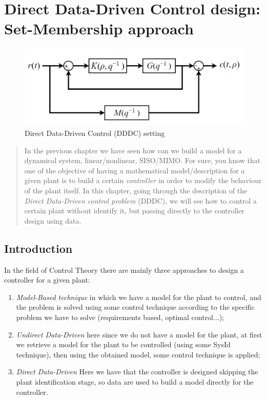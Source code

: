 \chapter[Direct Data-Driven Control (SM approach)]{Direct Data-Driven Control design: Set-Membership approach}\label{chap:DDDC}

\vspace{-1cm}
\begin{figure}[h]
    \centering
    \includegraphics[scale=0.4]{img/DDDC_1.png}
    \caption{Direct Data-Driven Control (DDDC) setting}
    \label{fig:DDDC_setting}
\end{figure}

\begin{quotation}
    \noindent
    \textsf{In the previous chapter we have seen how can we build a model for a dynamical system, linear/nonlinear, SISO/MIMO. For sure, you know that one of the objective of having a mathematical model/description for a given plant is to build a certain \textit{controller} in order to modify the behaviour of the plant itself. In this chapter, going through the description of the \textit{Direct Data-Driven control problem} (DDDC), we will see how to control a certain plant without identify it, but passing directly to the controller design using data.
    }
\end{quotation}

\section{Introduction}
In the field of Control Theory there are mainly three approaches to design a controller for a given plant: 
\begin{enumerate}
    \itemsep-0.2em
    \item \textit{Model-Based technique} in which we have a model for the plant to control, and the problem is solved using some control technique according to the specific problem we have to solve (requirements based, optimal control...);
    \item \textit{Undirect Data-Driven} here since we do not have a model for the plant, at first we retrieve a model  for the plant to be controlled (using some SysId technique), then using the obtained model, some control technique is applied; 
    \item \textit{Direct Data-Driven} Here we have that the controller is designed skipping the plant identification stage, so data are used to build a model directly for the controller.
\end{enumerate}

